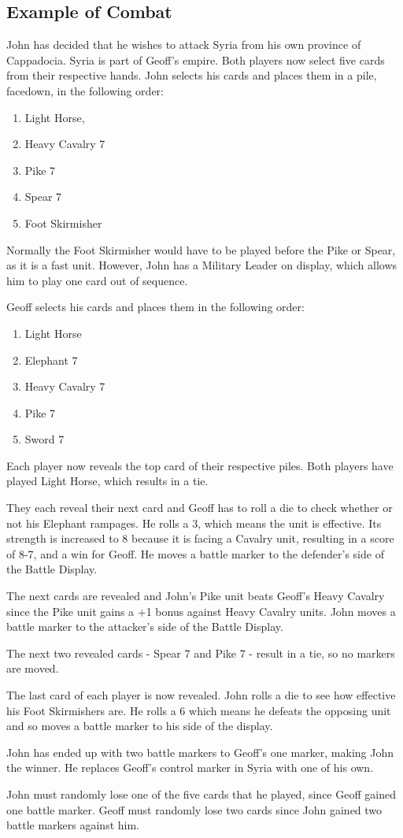 \subsection{Example of Combat}

John has decided that he wishes to attack Syria from his own province of Cappadocia. Syria is part of Geoff's empire. Both players now select five cards from their respective hands. John selects his cards and places them in a pile, facedown, in the following order:

\begin{enumerate}[nosep]
  \item Light Horse,
  \item Heavy Cavalry 7
  \item Pike 7
  \item Spear 7
  \item Foot Skirmisher
\end{enumerate}

Normally the Foot Skirmisher would have to be played before the Pike or Spear, as it is a fast unit. However, John has a Military Leader on display, which allows him to play one card out of sequence.

Geoff selects his cards and places them in the following order:

\begin{enumerate}[nosep]
  \item Light Horse
  \item Elephant 7
  \item Heavy Cavalry 7
  \item Pike 7
  \item Sword 7
\end{enumerate}

Each player now reveals the top card of their respective piles. Both players have played Light Horse, which results in a tie.

They each reveal their next card and Geoff has to roll a die to check whether or not his Elephant rampages. He rolls a 3, which means the unit is effective. Its strength is increased to 8 because it is facing a Cavalry unit, resulting in a score of 8-7, and a win for Geoff. He moves a battle marker to the defender’s side of the Battle Display.

The next cards are revealed and John’s Pike unit beats Geoff’s Heavy Cavalry since the Pike unit gains a +1 bonus against Heavy Cavalry units. John moves a battle marker to the attacker’s side of the Battle Display.

The next two revealed cards - Spear 7 and Pike 7 - result in a tie, so no markers are moved.

The last card of each player is now revealed. John rolls a die to see how effective his Foot Skirmishers are. He rolls a 6 which means he defeats the opposing unit and so moves a battle marker to his side of the display.

John has ended up with two battle markers to Geoff’s one marker, making John the winner. He replaces Geoff’s control marker in Syria with one of his own.

John must randomly lose one of the five cards that he played, since Geoff gained one battle marker. Geoff must randomly lose two cards since John gained two battle markers against him.
